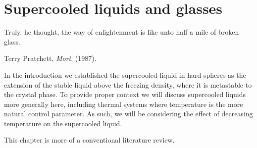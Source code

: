 \documentclass[11pt,twoside]{report}
\begin{document}
\chapter{Supercooled liquids and glasses}
\epigraph{Truly, he thought, the way of enlightenment is like unto half a mile of broken glass.}{Terry Pratchett, \emph{Mort}, (1987).}
\label{chapter:glass}

In the introduction we established the supercooled liquid in hard spheres as the extension of the stable liquid above the freezing density, where it is metastable to the crystal phase.
To provide proper context we will discuss supercooled liquids more generally here, including thermal systems where temperature is the more natural control parameter.
As such, we will be considering the effect of decreasing temperature on the supercooled liquid.

This chapter is more of a conventional literature review.





\end{document}
